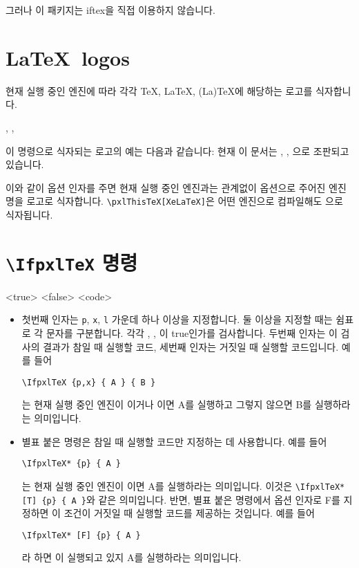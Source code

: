 \documentclass[b5paper,adjustmath,nanum]{oblivoir}
\begin{document}
그러나 이 패키지는 \textsf{iftex}을 직접 이용하지 않습니다.

\section{\LaTeX\ logos}

현재 실행 중인 엔진에 따라 각각 TeX, LaTeX, (La)TeX에 해당하는
로고를 식자합니다. 
\begin{boxedverbatim}
\pxlThisTeX, \pxlThisLaTeX, \pxlThisPLaTeX
\end{boxedverbatim}
이 명령으로 식자되는 로고의 예는 다음과 같습니다: 현재 이 문서는 
\pxlThisTeX, \pxlThisLaTeX, \pxlThisPLaTeX
으로 조판되고 있습니다.

\begin{boxedverbatim}
\pxlThisTeX [ <engine> ]
\end{boxedverbatim}
이와 같이 옵션 인자를 주면 현재 실행 중인 엔진과는 관계없이 옵션으로
주어진 엔진명을 로고로 식자합니다.
\verb|\pxlThisTeX[XeLaTeX]|은 어떤 엔진으로 컴파일해도 \pxlThisTeX[XeLaTeX]으로 식자됩니다.

\section{\texttt{\textbackslash IfpxlTeX} 명령}

\begin{boxedverbatim}
\IfpxlTeX { [p,x,l] } { <true> } { <false> }
\IfpxlTeX* [T/F] { [p,x,l] } { <code> } 
\end{boxedverbatim}

\begin{itemize}\tightlist
\item 첫번째 인자는 \texttt{p}, \texttt{x}, \texttt{l} 가운데 하나 이상을 지정합니다. 둘 이상을 지정할 때는 쉼표로 각 문자를 구분합니다. 각각 \pxlThisTeX[pdfTeX], \pxlThisTeX[XeTeX], \pxlThisTeX[LuaTeX]이 true인가를 검사합니다. 두번째 인자는 이 검사의 결과가 참일 때 실행할 코드, 세번째 인자는 거짓일 때 실행할 코드입니다.
예를 들어 
\begin{verbatim}
\IfpxlTeX {p,x} { A } { B }
\end{verbatim}
는 현재 실행 중인 엔진이 \pxlThisTeX[pdfTeX]이거나 \pxlThisTeX[XeTeX]이면
A를 실행하고 그렇지 않으면 B를 실행하라는 의미입니다.

\item 별표 붙은 명령은 참일 때 실행할 코드만 지정하는 데 사용합니다. 예를 들어
\begin{verbatim}
\IfpxlTeX* {p} { A }
\end{verbatim}
는 현재 실행 중인 엔진이 \pxlThisTeX[pdfTeX]이면 A를 실행하라는 의미입니다.
이것은 \verb|\IfpxlTeX* [T] {p} { A }|와 같은 의미입니다.
반면, 별표 붙은 명령에서 옵션 인자로 F를 지정하면 이 조건이 거짓일 때 실행할 코드를 제공하는 것입니다. 예를 들어
\begin{verbatim}
\IfpxlTeX* [F] {p} { A }
\end{verbatim}
라 하면 \pxlThisTeX[pdfTeX]이 실행되고 있지  A를 실행하라는 의미입니다.
\end{itemize}
\end{document}
